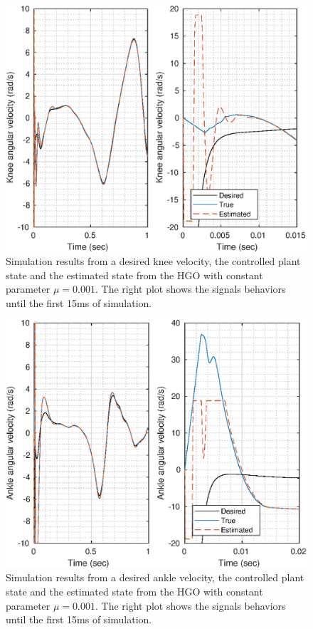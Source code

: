 \documentclass[letterpaper, 10 pt, journal, twocolumn]{IEEEtran}  %
\theoremstyle{plain}
\theoremstyle{definition}
\theoremstyle{remark}
\begin{document}
%
%
\begin{figure}[h!]
	\begin{center}
	\includegraphics[width = \columnwidth]{Figs/dq_knee_mu_1e-03.eps}
	\caption{Simulation results from a desired knee velocity, the controlled plant state and the estimated state from the HGO with constant parameter $\mu=0.001$. The right plot shows the signals behaviors until the first 15ms of simulation.}
	\label{fig:dknee}
	\end{center}
\end{figure}
%
%
\begin{figure}[h!]
	\begin{center}
	\includegraphics[width = \columnwidth]{Figs/dq_ankle_mu_1e-03.eps}
	\caption{Simulation results from a desired ankle velocity, the controlled plant state and the estimated state from the HGO with constant parameter $\mu=0.001$. The right plot shows the signals behaviors until the first 15ms of simulation.}
	\label{fig:dankle}
	\end{center}
\end{figure}
%
\end{document}
